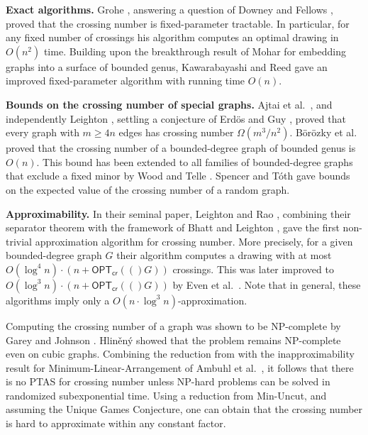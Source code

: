 \documentclass[twoside,leqno,twocolumn]{article}
\newcommand{\optcro}[1]{\mathsf{OPT}_{\mathsf{cr}}(#1)}
\begin{document}
\textbf{Exact algorithms.}
Grohe \cite{Grohe04}, answering a question of Downey and Fellows \cite{fpt}, proved that the crossing number is fixed-parameter tractable.
In particular, for any fixed number of crossings his algorithm computes an optimal drawing in $O(n^2)$ time.
Building upon the breakthrough result of Mohar \cite{Mohar99} for embedding graphs into a surface of bounded genus, Kawarabayashi and Reed \cite{KawarabayashiR07} gave an improved fixed-parameter algorithm with running time $O(n)$.

\textbf{Bounds on the crossing number of special graphs.}
Ajtai et al.~\cite{ajtai82}, and independently Leighton \cite{leighton_book}, settling a conjecture of Erd\"{o}s and Guy \cite{erdos_guy73}, proved that every graph with $m\geq 4n$ edges has crossing number $\Omega(m^3/n^2)$.
B\"{o}r\"{o}zky et al.~\cite{BorozkyPT06} proved that 
the crossing number of a bounded-degree graph of bounded genus is $O(n)$.
This bound has been extended to all families of bounded-degree graphs that exclude a fixed minor by Wood and Telle \cite{WoodT06}.
Spencer and T\'{o}th \cite{spencer_random} gave bounds on the expected value of the crossing number of a random graph.







\iffalse


\textbf{Approximability.}
In their seminal paper, Leighton and Rao \cite{LR}, combining their separator theorem with the framework of Bhatt and Leighton \cite{bhatt84}, gave the first non-trivial approximation algorithm for crossing number.
More precisely, for a given bounded-degree graph $G$ their algorithm computes a drawing with at most $O(\log^4 n) \cdot (n + \optcro(G))$ crossings.
This was later improved to $O(\log^3 n) \cdot (n+\optcro(G))$ by Even et al.~\cite{EvenGS02}.
Note that in general, these algorithms imply only a $O(n \cdot \log^3 n)$-approximation.

Computing the crossing number of a graph was shown to be NP-complete by Garey and Johnson \cite{crossing_np_complete}.
Hlin\v{e}n\'{y} \cite{Hlineny06a} showed that the problem remains NP-complete even on cubic graphs.
Combining the reduction from \cite{crossing_np_complete} with the inapproximability result for Minimum-Linear-Arrangement of Ambuhl et al.~\cite{Ambuhl07}, it follows that there is no PTAS for crossing number unless NP-hard problems can be solved in randomized subexponential time.
Using a reduction from Min-Uncut, and assuming the Unique Games Conjecture, one can obtain that the crossing number is hard to approximate within any constant factor.
\end{document}

